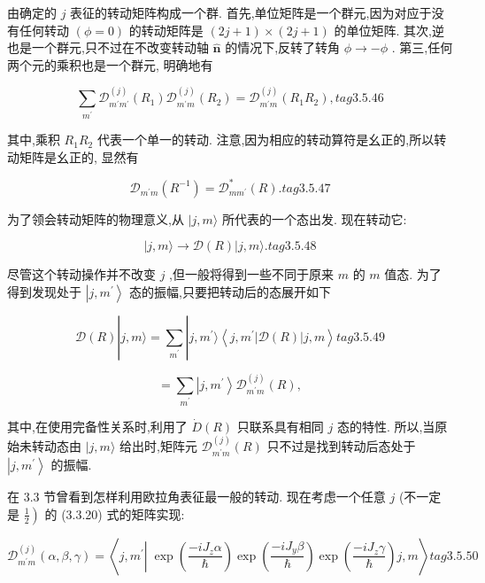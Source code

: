 由确定的 $j$ 表征的转动矩阵构成一个群. 首先,单位矩阵是一个群元,因为对应于没有任何转动 $\left( {\phi = 0}\right)$ 的转动矩阵是 $\left( {{2j} + 1}\right) \times \left( {{2j} + 1}\right)$ 的单位矩阵. 其次,逆也是一个群元,只不过在不改变转动轴 $\widehat{\mathbf{n}}$ 的情况下,反转了转角 $\phi \rightarrow - \phi$ . 第三,任何两个元的乘积也是一个群元, 明确地有

$$
\mathop{\sum }\limits_{{m}^{\prime }}{\mathcal{D}}_{{m}^{\prime }{m}^{\prime }}^{\left( j\right) }\left( {R}_{1}\right) {\mathcal{D}}_{{m}^{\prime }m}^{\left( j\right) }\left( {R}_{2}\right) = {\mathcal{D}}_{{m}^{\prime }m}^{\left( j\right) }\left( {{R}_{1}{R}_{2}}\right) , tag{3. 5.46}
$$

其中,乘积 ${R}_{1}{R}_{2}$ 代表一个单一的转动. 注意,因为相应的转动算符是幺正的,所以转动矩阵是幺正的, 显然有

$$
{\mathcal{D}}_{{m}^{\prime }m}\left( {R}^{-1}\right) = {\mathcal{D}}_{m{m}^{\prime }}^{ * }\left( R\right) . tag{3.5.47}
$$

为了领会转动矩阵的物理意义,从 $|j, m\rangle$ 所代表的一个态出发. 现在转动它:

$$
\left| {j, m\rangle \rightarrow \mathcal{D}\left( R\right) }\right| j, m\rangle . tag{3. 5.48}
$$

尽管这个转动操作并不改变 $j$ ,但一般将得到一些不同于原来 $m$ 的 $m$ 值态. 为了得到发现处于 $\left| {j,{m}^{\prime }}\right\rangle$ 态的振幅,只要把转动后的态展开如下

$$
\mathcal{D}\left( R\right) \left| {j, m\rangle = \mathop{\sum }\limits_{{m}^{\prime }}}\right| j,{m}^{\prime }\rangle \left\langle {j,{m}^{\prime }\left| {\mathcal{D}\left( R\right) }\right| j, m}\right\rangle tag{3. 5.49}
$$

$$
= \mathop{\sum }\limits_{{m}^{\prime }}\left| {j,{m}^{\prime }}\right\rangle {\mathcal{D}}_{{m}^{\prime }m}^{\left( j\right) }\left( R\right) ,
$$

其中,在使用完备性关系时,利用了 $\dot{D}\left( R\right)$ 只联系具有相同 $j$ 态的特性. 所以,当原始未转动态由 $|j, m\rangle$ 给出时,矩阵元 ${\mathcal{D}}_{{m}^{\prime }m}^{\left( j\right) }\left( R\right)$ 只不过是找到转动后态处于 $\left| {j,{m}^{\prime }}\right\rangle$ 的振幅.

在 3.3 节曾看到怎样利用欧拉角表征最一般的转动. 现在考虑一个任意 $j$ (不一定是 $\left. \frac{1}{2}\right)$ 的 (3.3.20) 式的矩阵实现:

$$
{\mathcal{D}}_{{m}^{\prime }m}^{\left( j\right) }\left( {\alpha ,\beta ,\gamma }\right) = \left\langle {j,{m}^{\prime }\left| {\;\exp \left( \frac{-i{J}_{z}\alpha }{\hslash }\right) \exp \left( \frac{-i{J}_{y}\beta }{\hslash }\right) \exp \left( \frac{-i{J}_{z}\gamma }{\hslash }\right) }\right. j, m}\right\rangle tag{3. 5.50}
$$

